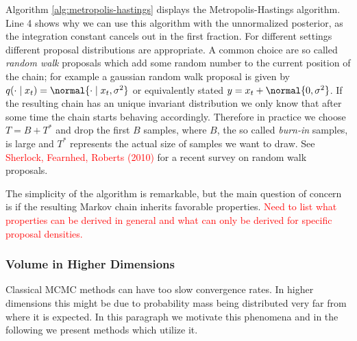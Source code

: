 \noindent
Algorithm \ref{alg:metropolis-hastings} displays the Metropolis-Hastings algorithm.
Line 4 shows why we can use this algorithm with the unnormalized posterior, as the integration constant cancels out in the first fraction.
For different settings different proposal distributions are appropriate.
A common choice are so called \emph{random walk} proposals which add some random number to the current position of the chain; for example a gaussian random walk proposal is given by $q(\cdot \mid x_t) = \normal{\cdot \mid x_t, \sigma^2}$ or equivalently stated $y = x_t + \normal{0, \sigma^2}$.
If the resulting chain has an unique invariant distribution we only know that after some time the chain starts behaving accordingly.
Therefore in practice we choose $T = B + T^*$ and drop the first $B$ samples, where $B$, the so called \emph{burn-in} samples, is large and $T^*$ represents the actual size of samples we want to draw.
See \textcolor{red}{Sherlock, Fearnhed, Roberts (2010)} for a recent survey on random walk proposals.

The simplicity of the algorithm is remarkable, but the main question of concern is if the resulting Markov chain inherits favorable properties.
\textcolor{red}{Need to list what properties can be derived in general and what can only be derived for specific proposal densities.}

\subsubsection*{Volume in Higher Dimensions}
Classical MCMC methods can have too slow convergence rates.
In higher dimensions this might be due to probability mass being distributed very far from where it is expected.
In this paragraph we motivate this phenomena and in the following we present methods which utilize it.

